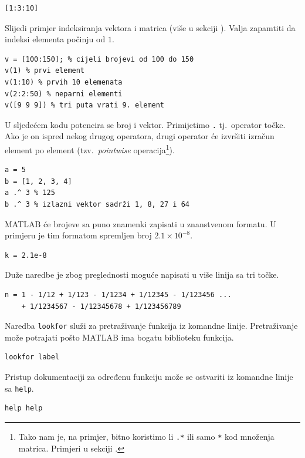 \documentclass[a4paper, 10pt]{article}
\newcommand{\spec}[1]{\texttt{#1}} %
\newcommand{\eng}[1]{\emph{#1}} %
\begin{document}
\begin{lstlisting}
[1:3:10]
\end{lstlisting}

Slijedi primjer indeksiranja vektora i matrica (više u sekciji ).
Valja zapamtiti da indeksi elementa počinju od $1$.

\begin{lstlisting}
v = [100:150]; % cijeli brojevi od 100 do 150
v(1) % prvi element
v(1:10) % prvih 10 elemenata
v(2:2:50) % neparni elementi
v([9 9 9]) % tri puta vrati 9. element
\end{lstlisting}

U sljedećem kodu potencira se broj i vektor.
Primijetimo \spec{.} tj.\ operator točke.
Ako je on ispred nekog drugog operatora, drugi operator će izvršiti izračun element po element (tzv.\ \eng{pointwise} operacija\footnote{Tako nam je, na primjer, bitno koristimo li \spec{.*} ili samo \spec{*} kod množenja matrica.
Primjeri u sekciji .}).

\begin{lstlisting}
a = 5
b = [1, 2, 3, 4]
a .^ 3 % 125
b .^ 3 % izlazni vektor sadrži 1, 8, 27 i 64
\end{lstlisting}

MATLAB će brojeve sa puno znamenki zapisati u znanstvenom formatu.
U primjeru je tim formatom spremljen broj $2.1 \times 10^{-8}$.

\begin{lstlisting}
k = 2.1e-8
\end{lstlisting}

Duže naredbe je zbog preglednosti moguće napisati u više linija sa tri točke.

\begin{lstlisting}
n = 1 - 1/12 + 1/123 - 1/1234 + 1/12345 - 1/123456 ...
    + 1/1234567 - 1/12345678 + 1/123456789
\end{lstlisting}

Naredba \spec{lookfor} služi za pretraživanje funkcija iz komandne linije.
Pretraživanje može potrajati pošto MATLAB ima bogatu biblioteku funkcija.

\begin{lstlisting}
lookfor label
\end{lstlisting}

Pristup dokumentaciji za određenu funkciju može se ostvariti iz komandne linije sa \spec{help}.

\begin{lstlisting}
help help
\end{lstlisting}
\end{document}

